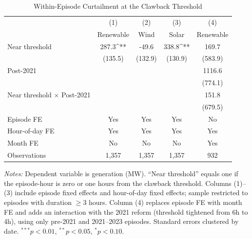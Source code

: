 \begin{table}[t]
\centering
\caption{Within-Episode Curtailment at the Clawback Threshold}
\label{tab:curtailment}
\begin{tabular}{lcccc}
\hline\hline
 & (1) & (2) & (3) & (4) \\
 & Renewable & Wind & Solar & Renewable \\
\hline
Near threshold & 287.3^{**} & -49.6 & 338.8^{**} & 169.7 \\
 & (135.5) & (132.9) & (130.9) & (583.9) \\
Post-2021 & & & & 1116.6 \\
 & & & & (774.1) \\
Near threshold $\times$ Post-2021 & & & & 151.8 \\
 & & & & (679.5) \\
\hline
Episode FE & Yes & Yes & Yes & No \\
Hour-of-day FE & Yes & Yes & Yes & Yes \\
Month FE & No & No & No & Yes \\
Observations & 1,357 & 1,357 & 1,357 & 932 \\
\hline\hline
\end{tabular}
\begin{tablenotes}[flushleft]
\footnotesize
\item \textit{Notes:} Dependent variable is generation (MW). ``Near threshold'' equals one if the episode-hour is zero or one hours from the clawback threshold. Columns (1)--(3) include episode fixed effects and hour-of-day fixed effects; sample restricted to episodes with duration $\geq 3$ hours. Column (4) replaces episode FE with month FE and adds an interaction with the 2021 reform (threshold tightened from 6h to 4h), using only pre-2021 and 2021--2023 episodes. Standard errors clustered by date. $^{***}p<0.01$, $^{**}p<0.05$, $^{*}p<0.10$.
\end{tablenotes}
\end{table}
